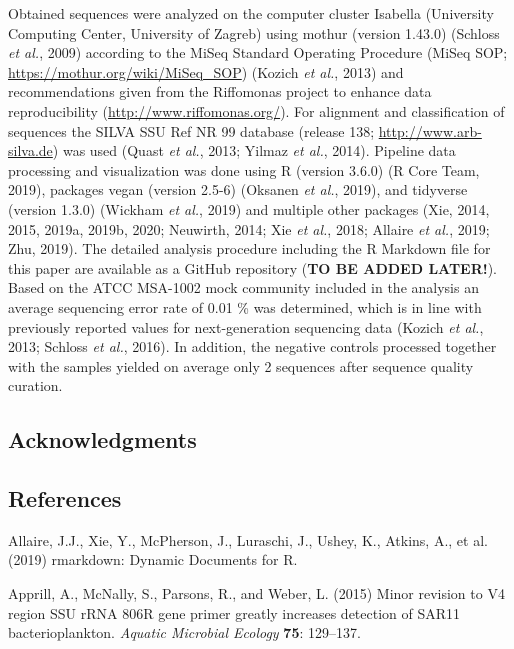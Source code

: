 \documentclass[12pt,]{article}
\begin{document}
Obtained sequences were analyzed on the computer cluster Isabella
(University Computing Center, University of Zagreb) using mothur
(version 1.43.0) (Schloss \emph{et al.}, 2009) according to the MiSeq
Standard Operating Procedure (MiSeq SOP;
\url{https://mothur.org/wiki/MiSeq_SOP}) (Kozich \emph{et al.}, 2013)
and recommendations given from the Riffomonas project to enhance data
reproducibility (\url{http://www.riffomonas.org/}). For alignment and
classification of sequences the SILVA SSU Ref NR 99 database (release
138; \url{http://www.arb-silva.de}) was used (Quast \emph{et al.}, 2013;
Yilmaz \emph{et al.}, 2014). Pipeline data processing and visualization
was done using R (version 3.6.0) (R Core Team, 2019), packages vegan
(version 2.5-6) (Oksanen \emph{et al.}, 2019), and tidyverse (version
1.3.0) (Wickham \emph{et al.}, 2019) and multiple other packages (Xie,
2014, 2015, 2019a, 2019b, 2020; Neuwirth, 2014; Xie \emph{et al.}, 2018;
Allaire \emph{et al.}, 2019; Zhu, 2019). The detailed analysis procedure
including the R Markdown file for this paper are available as a GitHub
repository (\textbf{TO BE ADDED LATER!}). Based on the ATCC MSA-1002
mock community included in the analysis an average sequencing error rate
of 0.01 \si{\percent} was determined, which is in line with previously
reported values for next-generation sequencing data (Kozich \emph{et
al.}, 2013; Schloss \emph{et al.}, 2016). In addition, the negative
controls processed together with the samples yielded on average only 2
sequences after sequence quality curation.

\hypertarget{acknowledgments}{%
\subsection{Acknowledgments}\label{acknowledgments}}

\newpage

\hypertarget{references}{%
\subsection{References}\label{references}}

\hypertarget{refs}{}
\leavevmode\hypertarget{ref-Allaire2019}{}%
Allaire, J.J., Xie, Y., McPherson, J., Luraschi, J., Ushey, K., Atkins,
A., et al. (2019) rmarkdown: Dynamic Documents for R.

\leavevmode\hypertarget{ref-Apprill2015}{}%
Apprill, A., McNally, S., Parsons, R., and Weber, L. (2015) Minor
revision to V4 region SSU rRNA 806R gene primer greatly increases
detection of SAR11 bacterioplankton. \emph{Aquatic Microbial Ecology}
\textbf{75}: 129--137.
\end{document}
